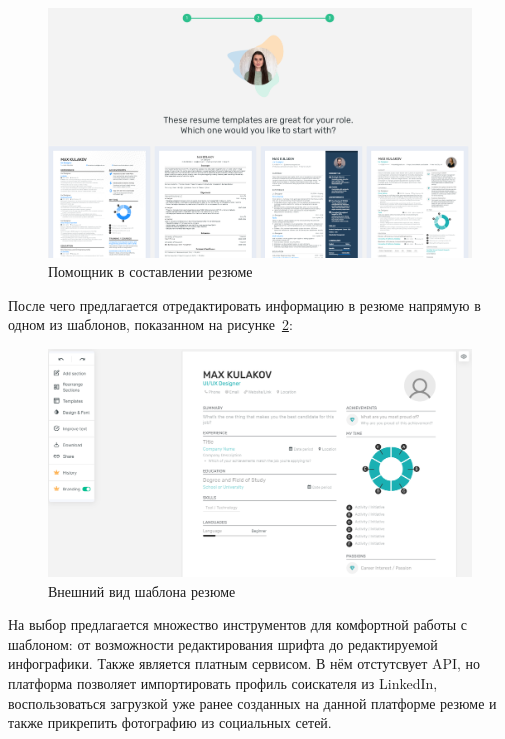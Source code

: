 \documentclass[master, och, diploma]{SCWorks}
\begin{document}
\begin{figure}[!ht]
    \centering
    \includegraphics[width=12cm]{images/image16.png}
    \caption{\label{fig:18}%
        Помощник в составлении резюме}
\end{figure}

После чего предлагается отредактировать информацию в резюме напрямую в одном из шаблонов, показанном на рисунке~\ref{fig:19}:
\begin{figure}[!ht]
    \centering
    \includegraphics[width=12cm]{images/image20.png}
    \caption{\label{fig:19}%
        Внешний вид шаблона резюме}
\end{figure}

На выбор предлагается множество инструментов для комфортной работы с шаблоном: от возможности редактирования шрифта до редактируемой инфографики. Также является платным сервисом. В нём отстутсвует API, но платформа позволяет импортировать профиль соискателя из LinkedIn, воспользоваться загрузкой уже ранее созданных на данной платформе резюме и также прикрепить фотографию из социальных сетей.
\end{document}
